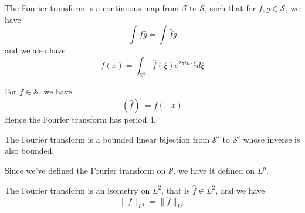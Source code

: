 \documentclass[lang=en,10pt, color=black]{../elegantbook}
\newcommand{\R}{\mathbb{R}}
\begin{document}
\begin{theorem}
    The Fourier transform is a continuous map from $\mathcal{S}$ to $\mathcal{S}$, such that for $f,g\in\mathcal{S}$, we have
    \begin{equation*}
        \int f\hat{g}=\int \hat{f}g
    \end{equation*}
    and we also have
    \begin{equation*}
        f(x)=\int_{\R^n}\hat{f}(\xi)e^{2\pi in\cdot\xi}d\xi
    \end{equation*}
\end{theorem}
\begin{comment}
    Note just like for a lot of things, we can assume $x=0$ for the Fourier inversion formula. And that translation by $x$ is just $e^{2\pi in\cdot\xi}$ in the Fourier space.
\end{comment}
\begin{corollary}
    For $f\in\mathcal{S}$, we have
    \begin{equation*}
        (\hat{f})^{\widehat{\phantom{.}}}=f(-x)
    \end{equation*}
    Hence the Fourier transform has period 4.
\end{corollary}

\begin{theorem}
    The Fourier transform is a bounded linear bijection from $\mathcal{S}'$ to $\mathcal{S}'$ whose inverse is also bounded.
\end{theorem}
\begin{comment}
    Recall we define the Fourier transform on $\mathcal{S}'$ by 
    \begin{equation*}
        \hat{T}(f)=T(\hat{f})
    \end{equation*}
\end{comment}

Since we've defined the Fourier transform on $\mathcal{S}$, we have it defined on $L^p$.
\begin{theorem}[Plancherel]
    The Fourier transform is an isometry on $L^2$, that is $\hat{f}\in L^2$, and we have
    \begin{equation*}
        \|f\|_{L^2}=\|\hat{f}\|_{L^2}
    \end{equation*}
\end{theorem}
\begin{comment}
    Note that we proved this using the duality formula in Theorem 1.7 by setting $\oveline{f}=\hat{g}$ for some $g$, and have $g=\overline{\hat{f}}$.
\end{comment}
\end{document}
